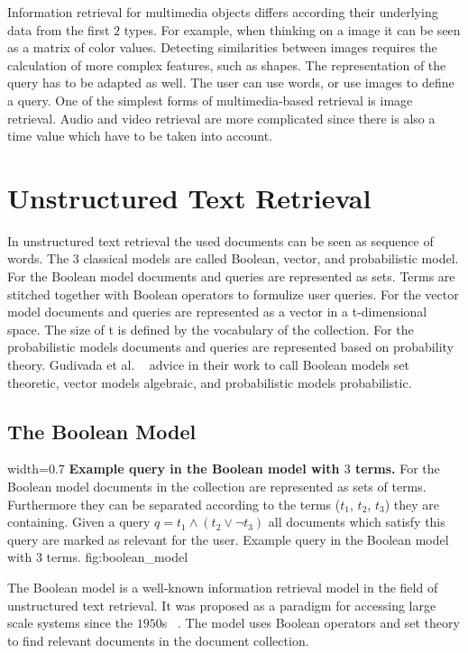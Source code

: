 Information retrieval for multimedia objects differs according their underlying data from the first $2$ types. For example, when thinking on a image it can be seen as a matrix of color values. Detecting similarities between images requires the calculation of more complex features, such as shapes. The representation of the query has to be adapted as well. The user can use words, or use images to define a query. One of the simplest forms of multimedia-based retrieval is image retrieval. Audio and video retrieval are more complicated since there is also a time value which have to be taken into account.

\section{Unstructured Text Retrieval}
\label{sec:unstructured_text_Retrieval}

In unstructured text retrieval the used documents can be seen as sequence of words. The $3$ classical models are called Boolean, vector, and probabilistic model. For the Boolean model documents and queries are represented as sets. Terms are stitched together with Boolean operators to formulize user queries. For the vector model documents and queries are represented as a vector in a t-dimensional space. The size of t is defined by the vocabulary of the collection. For the probabilistic models documents and queries are represented based on probability theory. Gudivada et al. ~\cite{gudivada1997} advice in their work to call Boolean models set theoretic, vector models algebraic, and probabilistic models probabilistic.

\subsection{The Boolean Model}
\label{sec:the_boolean_model}

      {width=0.7\textwidth}
      {\textbf{Example query in the Boolean model with $3$ terms.} For the Boolean model documents in the collection are represented as sets of terms. Furthermore they can be separated according to the terms ($t_1$, $t_2$, $t_3$) they are containing. Given a query $q=t_1 \wedge (t_2 \vee \neg t_3)$ all documents which satisfy this query are marked as relevant for the user.}
      {Example query in the Boolean model with $3$ terms.}
      {fig:boolean_model}

The Boolean model is a well-known information retrieval model in the field of unstructured text retrieval. It was proposed as a paradigm for accessing large scale systems since the $1950$s ~\cite{Melucci2009}. The model uses Boolean operators and set theory to find relevant documents in the document collection.

